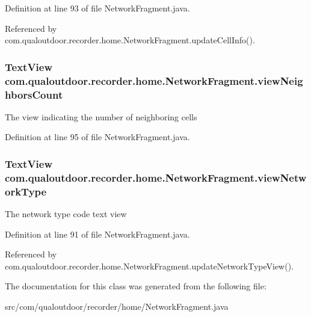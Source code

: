 Definition at line 93 of file Network\-Fragment.\-java.



Referenced by com.\-qualoutdoor.\-recorder.\-home.\-Network\-Fragment.\-update\-Cell\-Info().

\hypertarget{classcom_1_1qualoutdoor_1_1recorder_1_1home_1_1NetworkFragment_a7b0e6b40540b22cd96bc55bb0f92863c}{
\subsubsection[{view\-Neighbors\-Count}]{\setlength{\rightskip}{0pt plus 5cm}Text\-View com.\-qualoutdoor.\-recorder.\-home.\-Network\-Fragment.\-view\-Neighbors\-Count\hspace{0.3cm}{\ttfamily [private]}}}\label{classcom_1_1qualoutdoor_1_1recorder_1_1home_1_1NetworkFragment_a7b0e6b40540b22cd96bc55bb0f92863c}
The view indicating the number of neighboring cells 

Definition at line 95 of file Network\-Fragment.\-java.

\hypertarget{classcom_1_1qualoutdoor_1_1recorder_1_1home_1_1NetworkFragment_a173f53c15b13d08ff7336cfa79c2fedf}{
\subsubsection[{view\-Network\-Type}]{\setlength{\rightskip}{0pt plus 5cm}Text\-View com.\-qualoutdoor.\-recorder.\-home.\-Network\-Fragment.\-view\-Network\-Type\hspace{0.3cm}{\ttfamily [private]}}}\label{classcom_1_1qualoutdoor_1_1recorder_1_1home_1_1NetworkFragment_a173f53c15b13d08ff7336cfa79c2fedf}
The network type code text view 

Definition at line 91 of file Network\-Fragment.\-java.



Referenced by com.\-qualoutdoor.\-recorder.\-home.\-Network\-Fragment.\-update\-Network\-Type\-View().



The documentation for this class was generated from the following file\-:\begin{DoxyCompactItemize}
\item 
src/com/qualoutdoor/recorder/home/Network\-Fragment.\-java\end{DoxyCompactItemize}
